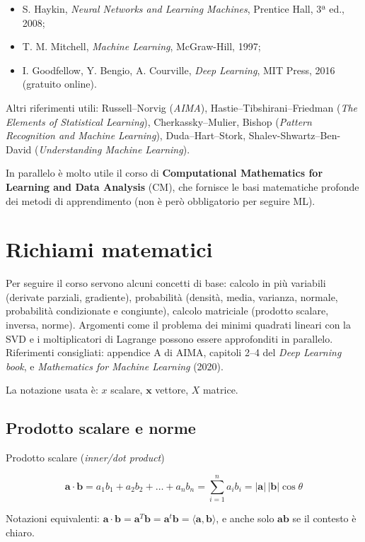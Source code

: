 \begin{itemize}
\tightlist
\item
  S. Haykin, \emph{Neural Networks and Learning Machines}, Prentice
  Hall, 3ª ed., 2008;
\item
  T. M. Mitchell, \emph{Machine Learning}, McGraw-Hill, 1997;
\item
  I. Goodfellow, Y. Bengio, A. Courville, \emph{Deep Learning}, MIT
  Press, 2016 (gratuito online).
\end{itemize}

Altri riferimenti utili: Russell--Norvig (\emph{AIMA}),
Hastie--Tibshirani--Friedman (\emph{The Elements of Statistical
Learning}), Cherkassky--Mulier, Bishop (\emph{Pattern Recognition and
Machine Learning}), Duda--Hart--Stork, Shalev-Shwartz--Ben-David
(\emph{Understanding Machine Learning}).

In parallelo è molto utile il corso di \textbf{Computational Mathematics
for Learning and Data Analysis} (CM), che fornisce le basi matematiche
profonde dei metodi di apprendimento (non è però obbligatorio per
seguire ML).

\section{Richiami matematici}\label{richiami-matematici}

Per seguire il corso servono alcuni concetti di base: calcolo in più
variabili (derivate parziali, gradiente), probabilità (densità, media,
varianza, normale, probabilità condizionate e congiunte), calcolo
matriciale (prodotto scalare, inversa, norme). Argomenti come il
problema dei minimi quadrati lineari con la SVD e i moltiplicatori di
Lagrange possono essere approfonditi in parallelo. Riferimenti
consigliati: appendice A di AIMA, capitoli 2--4 del \emph{Deep Learning
book}, e \emph{Mathematics for Machine Learning} (2020).

La notazione usata è: \(x\) scalare, \(\mathbf{x}\) vettore, \(X\)
matrice.

\subsection{Prodotto scalare e norme}\label{prodotto-scalare-e-norme}

\begin{boxdefinition}{Prodotto scalare (\emph{inner/dot product})}

\[
\mathbf{a} \cdot \mathbf{b} = a_1 b_1 + a_2 b_2 + \dots + a_n b_n = \sum_{i=1}^{n} a_i b_i = |\mathbf{a}|\,|\mathbf{b}| \cos\theta
\]

Notazioni equivalenti:
\(\mathbf{a}\cdot\mathbf{b} = \mathbf{a}^T\mathbf{b} = \mathbf{a}^t\mathbf{b} = \langle \mathbf{a}, \mathbf{b}\rangle\),
e anche solo \(\mathbf{ab}\) se il contesto è chiaro.

\end{boxdefinition}

